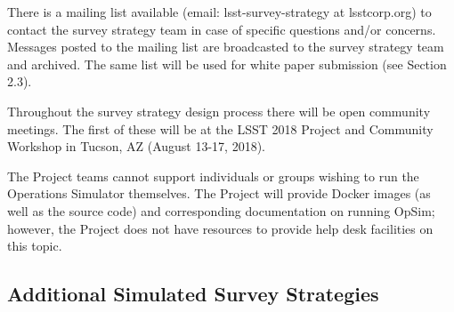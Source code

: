 \documentclass[DM,lsstdraft,toc,usenatbib]{lsstdoc}
\begin{document}
There is a mailing list available (email: lsst-survey-strategy at lsstcorp.org) to contact the survey strategy team in case of specific 
questions and/or concerns. Messages posted to the mailing list are broadcasted to the survey strategy team and archived. 
The same list will be used for white paper submission (see Section 2.3). 

Throughout the survey strategy design process there will be open community meetings. The first of these will be 
at the LSST 2018 Project and Community Workshop in Tucson, AZ (August 13-17, 2018). 

The Project teams cannot support individuals or groups wishing to run the Operations Simulator themselves. 
The Project will provide Docker images (as well as the source code) and corresponding documentation on running 
OpSim; however, the Project does not have resources to provide help desk facilities on this topic. 


\subsection{Additional Simulated Survey Strategies \label{sec:surveys}}
\end{document}
